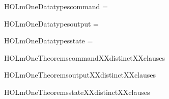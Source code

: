 \newcommand{\HOLmOneDate}{16 November 2017}
\newcommand{\HOLmOneTime}{12:09}
\begin{SaveVerbatim}{HOLmOneDatatypescommand}
 =  \HOLTokenBar{} 
\end{SaveVerbatim}
\newcommand{\HOLmOneDatatypescommand}{\UseVerbatim{HOLmOneDatatypescommand}}
\begin{SaveVerbatim}{HOLmOneDatatypesoutput}
 =  \HOLTokenBar{} 
\end{SaveVerbatim}
\newcommand{\HOLmOneDatatypesoutput}{\UseVerbatim{HOLmOneDatatypesoutput}}
\begin{SaveVerbatim}{HOLmOneDatatypesstate}
 =  \HOLTokenBar{}  \HOLTokenBar{} 
\end{SaveVerbatim}
\newcommand{\HOLmOneDatatypesstate}{\UseVerbatim{HOLmOneDatatypesstate}}
\newcommand{\HOLmOneDatatypes}{
\HOLmOneDatatypescommand\HOLmOneDatatypesoutput\HOLmOneDatatypesstate}
\begin{SaveVerbatim}{HOLmOneTheoremscommandXXdistinctXXclauses}
\HOLTokenTurnstile{}  \HOLSymConst{\HOLTokenNotEqual{}} 
\end{SaveVerbatim}
\newcommand{\HOLmOneTheoremscommandXXdistinctXXclauses}{\UseVerbatim{HOLmOneTheoremscommandXXdistinctXXclauses}}
\begin{SaveVerbatim}{HOLmOneTheoremsoutputXXdistinctXXclauses}
\HOLTokenTurnstile{}  \HOLSymConst{\HOLTokenNotEqual{}} 
\end{SaveVerbatim}
\newcommand{\HOLmOneTheoremsoutputXXdistinctXXclauses}{\UseVerbatim{HOLmOneTheoremsoutputXXdistinctXXclauses}}
\begin{SaveVerbatim}{HOLmOneTheoremsstateXXdistinctXXclauses}
\HOLTokenTurnstile{}  \HOLSymConst{\HOLTokenNotEqual{}}  \HOLSymConst{\HOLTokenConj{}}  \HOLSymConst{\HOLTokenNotEqual{}}  \HOLSymConst{\HOLTokenConj{}}  \HOLSymConst{\HOLTokenNotEqual{}} 
\end{SaveVerbatim}
\newcommand{\HOLmOneTheoremsstateXXdistinctXXclauses}{\UseVerbatim{HOLmOneTheoremsstateXXdistinctXXclauses}}
\newcommand{\HOLmOneTheorems}{
\HOLThmTag{m1}{command_distinct_clauses}\HOLmOneTheoremscommandXXdistinctXXclauses
\HOLThmTag{m1}{output_distinct_clauses}\HOLmOneTheoremsoutputXXdistinctXXclauses
\HOLThmTag{m1}{state_distinct_clauses}\HOLmOneTheoremsstateXXdistinctXXclauses
}
